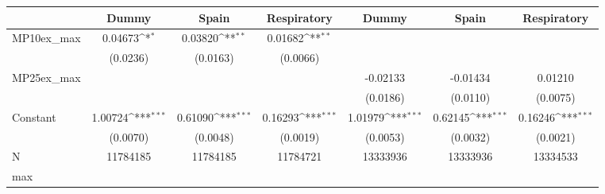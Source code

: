 {
\def\sym#1{\ifmmode^{#1}\else\(^{#1}\)\fi}
\begin{tabular}{l*{6}{c}}
\toprule
            &\multicolumn{1}{c}{Dummy}&\multicolumn{1}{c}{Spain}&\multicolumn{1}{c}{Respiratory}&\multicolumn{1}{c}{Dummy}&\multicolumn{1}{c}{Spain}&\multicolumn{1}{c}{Respiratory}\\
\midrule
MP10ex\_max  &     0.04673\sym{*}  &     0.03820\sym{**} &     0.01682\sym{**} &                     &                     &                     \\
            &    (0.0236)         &    (0.0163)         &    (0.0066)         &                     &                     &                     \\
MP25ex\_max  &                     &                     &                     &    -0.02133         &    -0.01434         &     0.01210         \\
            &                     &                     &                     &    (0.0186)         &    (0.0110)         &    (0.0075)         \\
Constant    &     1.00724\sym{***}&     0.61090\sym{***}&     0.16293\sym{***}&     1.01979\sym{***}&     0.62145\sym{***}&     0.16246\sym{***}\\
            &    (0.0070)         &    (0.0048)         &    (0.0019)         &    (0.0053)         &    (0.0032)         &    (0.0021)         \\
\midrule
N           &    11784185         &    11784185         &    11784721         &    13333936         &    13333936         &    13334533         \\
max         &                     &                     &                     &                     &                     &                     \\
\bottomrule
\end{tabular}
}
